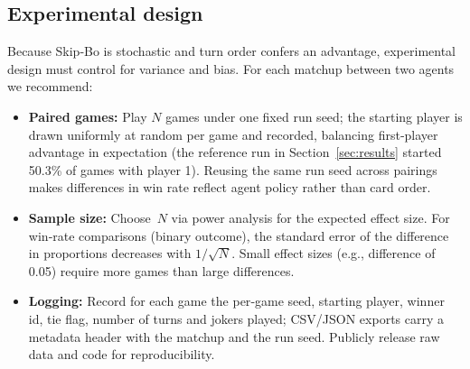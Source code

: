 \documentclass[11pt]{article}
\begin{document}
\subsection{Experimental design}
Because Skip‑Bo is stochastic and turn order confers an advantage, experimental design must control for variance and bias. For each matchup between two agents we recommend:
\begin{itemize}
\item \textbf{Paired games:} Play $N$ games under one fixed run seed; the starting player is drawn uniformly at random per game and recorded, balancing first‑player advantage in expectation (the reference run in Section~\ref{sec:results} started 50.3\% of games with player 1). Reusing the same run seed across pairings makes differences in win rate reflect agent policy rather than card order.
\item \textbf{Sample size:} Choose $N$ via power analysis for the expected effect size. For win‑rate comparisons (binary outcome), the standard error of the difference in proportions decreases with $1/\sqrt{N}$. Small effect sizes (e.g., difference of 0.05) require more games than large differences.
\item \textbf{Logging:} Record for each game the per‑game seed, starting player, winner id, tie flag, number of turns and jokers played; CSV/JSON exports carry a metadata header with the matchup and the run seed. Publicly release raw data and code for reproducibility.
\end{itemize}
\end{document}
